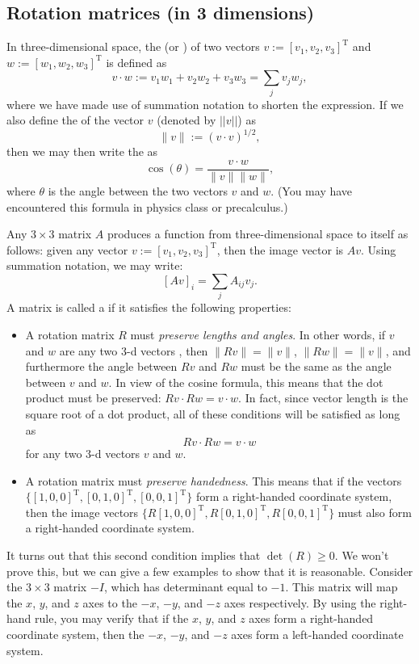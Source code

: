 \subsection{Rotation matrices (in 3 dimensions)}\label{subsec:rotMx3}
In three-dimensional space, the  (or ) of two vectors $v:=[v_1,v_2,v_3]^{\text{T}}$ and $w:=[w_1,w_2,w_3]^{\text{T}}$ is defined as
\[ v \cdot w :=  v_1w_1 + v_2w_2 + v_3w_3 = \sum_j v_j w_j ,\]
where we have made use of summation notation to shorten the expression. If we also define the  of the vector $v$ (denoted by $||v||$) as
\[ \lVert v\rVert := (v \cdot v)^{1/2}, \]
then we may then write the  as
\[ \cos(\theta) = \frac{v \cdot w}{\lVert v \rVert \lVert w \rVert}, \]
where $\theta$ is the angle between the two vectors $v$ and $w$. (You may have encountered this formula in physics class or precalculus.)

Any $3 \times 3$ matrix $A$  produces a function from three-dimensional space to itself as follows: given any vector $v:=[v_1,v_2,v_3]^{\text{T}}$, then the image vector is $Av$. Using summation notation, we may write:
\[ [Av]_i = \sum_j A_{ij} v_j.\]
A matrix is called a  if it satisfies the following properties:
\begin{itemize}
\item
A rotation matrix $R$ must  \emph{preserve  lengths and angles}. In other words, if $v$ and $w$ are any two 3-d vectors , then  $\lVert Rv \rVert = \lVert v \rVert$,  $\lVert Rw \rVert = \lVert v \rVert$, and furthermore the angle between $Rv$ and $Rw$ must be the same as the angle between $v$ and $w$.  In view of the cosine formula, this means that the dot product must be preserved:  $Rv \cdot Rw = v \cdot w$. In fact, since vector length is the square root of a dot product, all of these conditions will be satisfied as long as 
\[ Rv \cdot Rw = v \cdot w \] 
for any two 3-d vectors $v$ and $w$.
\item
A rotation matrix must \emph{preserve handedness}. This means that if the vectors $\{ [1,0,0]^{\text{T}}, [0,1,0]^{\text{T}}, [0,0,1]^{\text{T}} \}$ form a right-handed coordinate system, then the image vectors 
$\{ R[1,0,0]^{\text{T}}, R[0,1,0]^{\text{T}}, R[0,0,1]^{\text{T}} \}$ must also form a right-handed coordinate system.  
\end{itemize}

It turns out that this second condition implies that $\det(R)\ge 0$. We won't prove this, but we can give a few examples to show that it is reasonable. Consider  the $3 \times 3$ matrix $-I$, which has determinant equal to $-1$. This matrix will map the $x$, $y$, and $z$ axes to the $-x$, $-y$, and $-z$ axes respectively. By using the right-hand rule, you may verify that if the $x$, $y$, and $z$ axes form a right-handed coordinate system, then the $-x$, $-y$, and $-z$ axes form a left-handed coordinate system.

